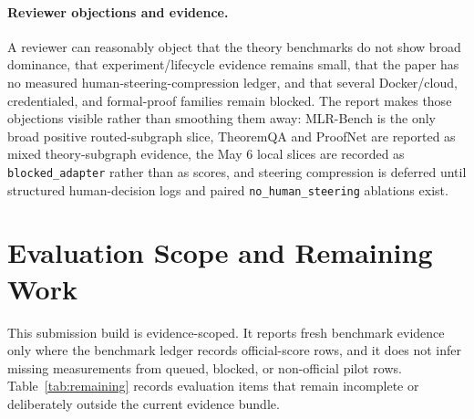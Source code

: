 \documentclass{article}
\begin{document}
\paragraph{Reviewer objections and evidence.}
A reviewer can reasonably object that the theory benchmarks do not show broad dominance, that experiment/lifecycle evidence remains small, that the paper has no measured human-steering-compression ledger, and that several Docker/cloud, credentialed, and formal-proof families remain blocked. The report makes those objections visible rather than smoothing them away: MLR-Bench is the only broad positive routed-subgraph slice, TheoremQA and ProofNet are reported as mixed theory-subgraph evidence, the May 6 local slices are recorded as \texttt{blocked\_adapter} rather than as scores, and steering compression is deferred until structured human-decision logs and paired \texttt{no\_human\_steering} ablations exist.

\section{Evaluation Scope and Remaining Work}
\label{sec:evaluation}
This submission build is evidence-scoped. It reports fresh benchmark evidence only where the benchmark ledger records official-score rows, and it does not infer missing measurements from queued, blocked, or non-official pilot rows. Table~\ref{tab:remaining} records evaluation items that remain incomplete or deliberately outside the current evidence bundle.
\end{document}

